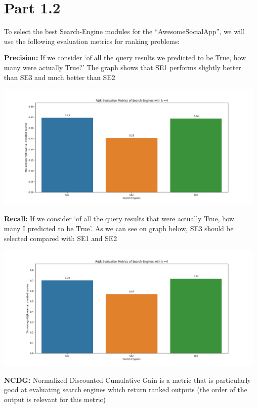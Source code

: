 \documentclass[10pt]{article}
\begin{document}
\section{Part 1.2}

To select the best Search-Engine modules for the “AwesomeSocialApp”, we will use the following evaluation metrics for ranking problems:

\textbf{Precision\@k:} If we consider ‘of all the query results we predicted to be True, how many were actually True?’ The graph shows that SE1 performs slightly better than SE3 and much better than SE2

\begin{center}
\includegraphics[scale=.25]{Pk.png}
\end{center}

\textbf{Recall\@k:} If we consider ‘of all the query results that were actually True, how many I predicted to be True’. As we can see on graph below, SE3 should be selected compared with SE1 and SE2

\begin{center}
\includegraphics[scale=.25]{Rk.png}
\end{center}

\textbf{NCDG\@k:} Normalized Discounted Cumulative Gain is a metric that is particularly good at evaluating search engines which return ranked outputs (the order of the output is relevant for this metric)
\end{document}
